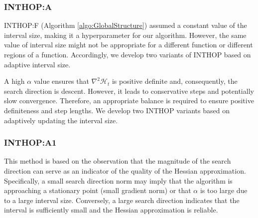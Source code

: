 \documentclass{elsarticle}
\numberwithin{equation}{section}
\begin{document}
\subsubsection{INTHOP:A} \label{sec:INTHOP:A}
INTHOP:F (Algorithm \ref{algo:GlobalStructure}) assumed a constant value of the interval size, making it a hyperparameter for our algorithm. However, the same value of interval size might not be appropriate for a different function or different regions of a function. Accordingly, we develop two variants of INTHOP based on adaptive interval size.

\newtheorem{lemma}{Lemma}


A high $\alpha$ value ensures that $\nabla^2\mathcal{H}_t$ is positive definite and, consequently, the search direction is descent. However, it leads to conservative steps and potentially slow convergence. Therefore, an appropriate balance is required to ensure positive definiteness and step lengths. We develop two INTHOP variants based on adaptively updating the interval size. 

\subsubsection{INTHOP:A1}

This method is based on the observation that the magnitude of the search direction can serve as an indicator of the quality of the Hessian approximation. Specifically, a small search direction norm may imply that the algorithm is approaching a stationary point (small gradient norm) or that $\alpha$ is too large due to a large interval size. Conversely, a large search direction indicates that the interval is sufficiently small and the Hessian approximation is reliable.
\end{document}
